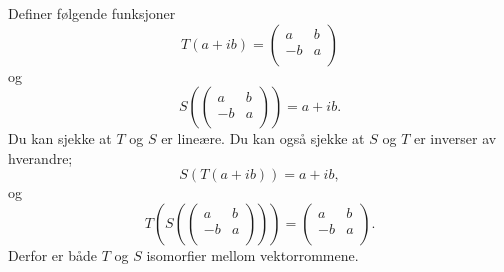 \begin{losning}
Definer følgende funksjoner 
$$T(a+ib)=\begin{pmatrix}
a & b \\
-b & a \\
\end{pmatrix}$$ og 
$$S(\begin{pmatrix}
a & b \\
-b & a \\
\end{pmatrix})=a+ib.$$ Du kan sjekke at $T$ og $S$ er lineære. Du kan også sjekke at $S$ og $T$ er inverser av hverandre; $$S(T(a+ib))=a+ib,$$ og $$T(S(\begin{pmatrix}
a & b \\
-b & a \\
\end{pmatrix}))=\begin{pmatrix}
a & b \\
-b & a \\
\end{pmatrix}.$$ Derfor er både $T$ og $S$ isomorfier mellom vektorrommene.
\end{losning}


%
%
%
%
%
%
%

